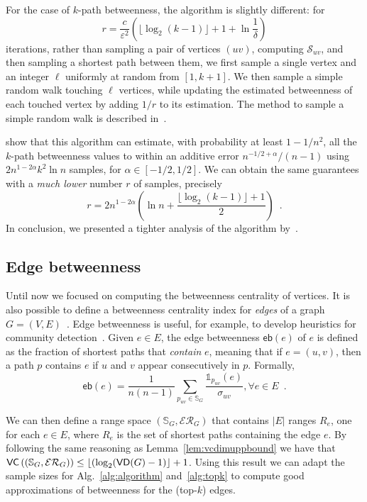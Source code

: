 For the case of $k$-path betweenness, the algorithm is slightly different:
for 
\[
  r= \frac{c}{\varepsilon^2}\left(\lfloor\log_2(k-1)\rfloor + 1 +\ln\frac{1}{\delta}\right)
\]
iterations, rather than sampling a pair of vertices $(uv)$, computing
$\mathcal{S}_{uv}$, and then sampling a shortest path between them, we first sample a
single vertex and an integer $\ell$ uniformly at random from $[1,k+1]$. We then
sample a simple random walk touching $\ell$ vertices, while updating the estimated
betweenness of each touched vertex by adding $1/r$ to its estimation. The method
to sample a simple random walk is described in~\citep{KourtellisASIT12}.

\citet{KourtellisASIT12} show that this algorithm can estimate, with probability
at least $1-1/n^2$, all the $k$-path betweenness values to within an additive
error $n^{-1/2+\alpha}/(n-1)$ using $2n^{1-2\alpha}k^2\ln n$ samples, for
$\alpha\in[-1/2,1/2]$. We can obtain the same guarantees with a \emph{much
lower} number $r$ of samples, precisely
\[
r=2n^{1-2\alpha}\left(\ln n+\frac{\lfloor\log_2(k-1)\rfloor+1}{2}\right)\enspace.
\]
In conclusion, we presented a tighter analysis of the algorithm
by~\citet{KourtellisASIT12}.

\subsection{Edge betweenness}
Until now we focused on computing the betweenness centrality of vertices. It is
also possible to define a betweenness centrality index for \emph{edges} of a
graph $G=(V,E)$~\citep{Anthonisse71,Brandes08}. Edge betweenness is useful, for
example, to develop heuristics for community detection~\citep{NewmanG04}. Given
$e\in E$, the edge betweenness $\mathsf{eb}(e)$ of $e$ is defined as the
fraction of shortest paths that \emph{contain} $e$, meaning that if $e=(u,v)$,
then a path $p$ contains $e$ if $u$ and $v$ appear consecutively in $p$.
Formally,
\[
\mathsf{eb}(e)=\frac{1}{n(n-1)}\sum_{p_{uv}\in\mathbb{S}_G}\frac{\mathds{1}_{p_{uv}}(e)}{\sigma_{uv}}, \forall e\in E\enspace.
\]

We can then define a range space $(\mathbb{S}_G,\mathcal{ER}_G)$ that contains
$|E|$ ranges $R_e$, one for each $e\in E$, where $R_e$ is the set of shortest
paths containing the edge $e$. By following the same reasoning as
Lemma~\ref{lem:vcdimuppbound} we have that
$\mathsf{VC}\left((\mathbb{S}_G,\mathcal{ER}_G)\right)\le\lfloor(\log_2(\mathsf{VD}(G) -
1)\rfloor + 1$. Using this result we can adapt the sample sizes for
Alg.~\ref{alg:algorithm} and~\ref{alg:topk} to compute good approximations of
betweenness for the (top-$k$) edges.

\fi

